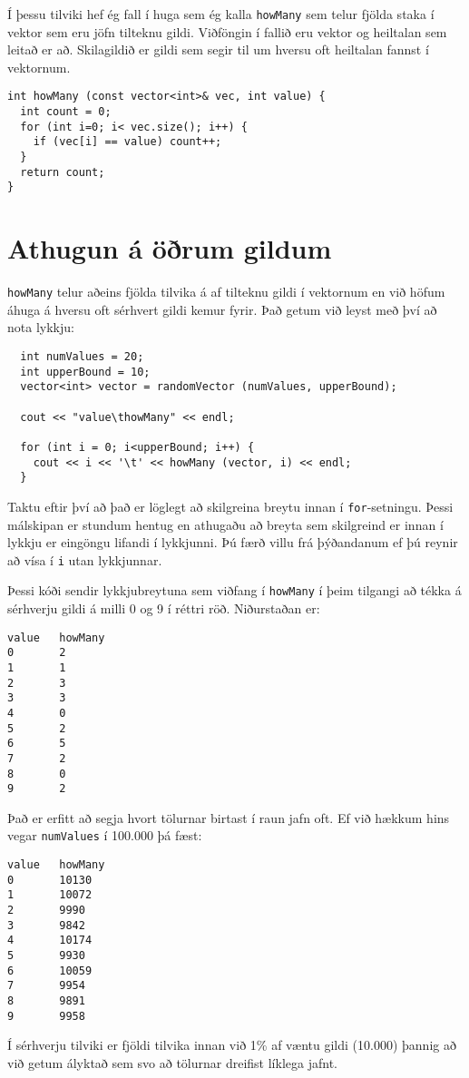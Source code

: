 Í þessu tilviki hef ég fall í huga sem ég kalla {\tt howMany} sem telur fjölda staka í vektor sem eru jöfn tilteknu gildi. 
Viðföngin í fallið eru vektor og heiltalan sem leitað er að.
Skilagildið er gildi sem segir til um hversu oft heiltalan fannst í vektornum.

\begin{verbatim}
int howMany (const vector<int>& vec, int value) {
  int count = 0;
  for (int i=0; i< vec.size(); i++) {
    if (vec[i] == value) count++;
  }
  return count;
}
\end{verbatim}


\section{Athugun á öðrum gildum}

{\tt howMany} telur aðeins fjölda tilvika á af tilteknu gildi í vektornum en við höfum áhuga á hversu oft sérhvert gildi kemur fyrir.
Það getum við leyst með því að nota lykkju:

\begin{verbatim}
  int numValues = 20;
  int upperBound = 10;
  vector<int> vector = randomVector (numValues, upperBound);

  cout << "value\thowMany" << endl;

  for (int i = 0; i<upperBound; i++) {
    cout << i << '\t' << howMany (vector, i) << endl;
  }
\end{verbatim}
%
Taktu eftir því að það er löglegt að skilgreina breytu innan í {\tt for}-setningu.
Þessi málskipan er stundum hentug en athugaðu að breyta sem skilgreind er innan í lykkju er eingöngu lifandi í lykkjunni.
Þú færð villu frá þýðandanum ef þú reynir að vísa í {\tt i} utan lykkjunnar.

Þessi kóði sendir lykkjubreytuna sem viðfang í {\tt howMany} í þeim tilgangi að tékka á sérhverju gildi á milli 0 og 9 í réttri röð.
Niðurstaðan er:

\begin{verbatim}
value   howMany
0       2
1       1
2       3
3       3
4       0
5       2
6       5
7       2
8       0
9       2
\end{verbatim}
%
Það er erfitt að segja hvort tölurnar birtast í raun jafn oft.
Ef við hækkum hins vegar {\tt numValues} í 100.000 þá fæst:

\begin{verbatim}
value   howMany
0       10130
1       10072
2       9990
3       9842
4       10174
5       9930
6       10059
7       9954
8       9891
9       9958
\end{verbatim}
%
Í sérhverju tilviki er fjöldi tilvika innan við 1\% af væntu gildi (10.000) þannig að við getum ályktað sem svo að tölurnar dreifist líklega jafnt.

